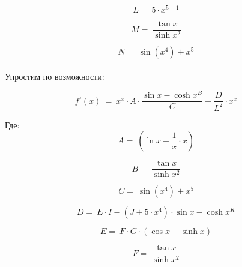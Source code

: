 \documentclass[a4paper, 12pt]{article}
\begin{document}
            \begin{equation}
            L =~5 \cdot x ^ {5 - 1}
            \end{equation}
            
            \begin{equation}
            M =~\dfrac{ \tan x }{  \sinh x ^ {2}}
            \end{equation}
            
            \begin{equation}
            N =~ \sin (x ^ {4}) + x ^ {5}
            \end{equation}
            \\ Упростим по возможности: \\
            \maketitle
            \begin{equation}
            f'(x)~=~x ^ {x} \cdot A \cdot \dfrac{ \sin x -  \cosh x ^ {B} }{ C} + \dfrac{D }{ L ^ {2}} \cdot x ^ {x}
    \end{equation}
    
    Где: \\
    
            \begin{equation}
            A =~( \ln x + \dfrac{1 }{ x} \cdot x)
            \end{equation}
            
            \begin{equation}
            B =~\dfrac{ \tan x }{  \sinh x ^ {2}}
            \end{equation}
            
            \begin{equation}
            C =~ \sin (x ^ {4}) + x ^ {5}
            \end{equation}
            
            \begin{equation}
            D =~E \cdot I - (J + 5 \cdot x ^ {4}) \cdot  \sin x -  \cosh x ^ {K}
            \end{equation}
            
            \begin{equation}
            E =~F \cdot G \cdot ( \cos x -  \sinh x)
            \end{equation}
            
            \begin{equation}
            F =~\dfrac{ \tan x }{  \sinh x ^ {2}}
            \end{equation}
            
\end{document}
